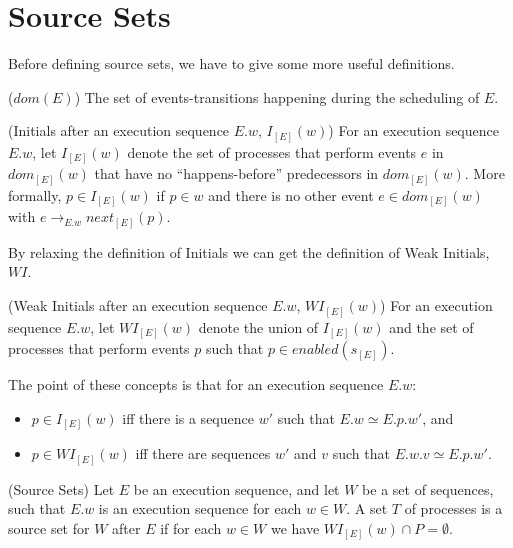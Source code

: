 
\section{Source Sets}

Before defining source sets, we have to give some more useful definitions.

\begin{definition}{($dom(E)$)}
    The set of events-transitions happening during the scheduling of $E$.
\end{definition}

\begin{definition}{(Initials after an execution sequence $E.w$, $I_{[E]}(w)$)}
For an execution sequence $E.w$, let $I_{[E]}(w)$ denote the set of
processes that perform events $e$ in $dom_{[E]}(w)$ that have no
“happens-before” predecessors in $dom_{[E]}(w)$. More formally,
$p \in I_{[E]}(w)$ if $p \in w$ and there is no other event $e \in dom_{[E]}(w)$ with
$e \rightarrow_{E.w} next_{[E]}(p)$.
\end{definition}

By relaxing the definition of Initials we can get the definition of Weak Initials, $WI$.

\begin{definition}{(Weak Initials after an execution sequence $E.w$, $WI_{[E]}(w)$)}
For an execution sequence $E.w$, let $WI_{[E]}(w)$ denote the union of $I_{[E]}(w)$ and the set of
processes that perform events $p$ such that $p \in enabled(s_{[E]}) $.
\end{definition}

The point of these concepts is that for an execution sequence $E.w$:
\begin{itemize}
    \item  $p \in I_{[E]}(w)$ iff there is a sequence $w'$ such that $E.w \simeq E.p.w'$, and
    \item  $p \in WI_{[E]}(w)$ iff there are sequences $w'$ and $v$ such that $E.w.v \simeq E.p.w'$.
\end{itemize}

\begin{definition}{(Source Sets)}
Let $E$ be an execution sequence,
and let $W$ be a set of sequences, such that $E.w$ is an execution
sequence for each $w \in W$. A set $T$ of processes is a source set for
$W$ after $E$ if for each $w \in W$ we have $WI_{[E]}(w) \cap P  = \emptyset$.
\end{definition}

